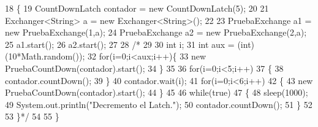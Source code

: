 \begin{DoxyCode}
18                                                                        \{
19         CountDownLatch contador = \textcolor{keyword}{new} CountDownLatch(5);
20         
21         Exchanger<String> a = \textcolor{keyword}{new} Exchanger<String>();
22         
23         PruebaExchange a1 = \textcolor{keyword}{new} PruebaExchange(1,a);
24         PruebaExchange a2 = \textcolor{keyword}{new} PruebaExchange(2,a);
25         a1.start();
26         a2.start();
27         
28         \textcolor{comment}{/*}
29 \textcolor{comment}{               }
30 \textcolor{comment}{        int i;}
31 \textcolor{comment}{        int aux = (int)(10*Math.random());}
32 \textcolor{comment}{        for(i=0;i<aux;i++)\{}
33 \textcolor{comment}{            new PruebaCountDown(contador).start();}
34 \textcolor{comment}{        \}        }
35 \textcolor{comment}{        }
36 \textcolor{comment}{        for(i=0;i<5;i++)}
37 \textcolor{comment}{        \{}
38 \textcolor{comment}{            contador.countDown();}
39 \textcolor{comment}{        \}}
40 \textcolor{comment}{        contador.wait(i);}
41 \textcolor{comment}{        for(i=0;i<6;i++)}
42 \textcolor{comment}{        \{}
43 \textcolor{comment}{            new PruebaCountDown(contador).start();}
44 \textcolor{comment}{        \}}
45 \textcolor{comment}{        }
46 \textcolor{comment}{        while(true)}
47 \textcolor{comment}{        \{}
48 \textcolor{comment}{            sleep(1000);}
49 \textcolor{comment}{            System.out.println("Decremento el Latch.");}
50 \textcolor{comment}{            contador.countDown();}
51 \textcolor{comment}{        \}}
52 \textcolor{comment}{        }
53 \textcolor{comment}{    \}*/}
54     
55     \}
\end{DoxyCode}
